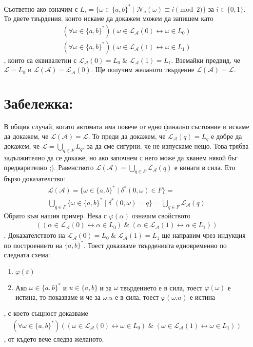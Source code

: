 \documentclass[12pt]{article}
\begin{document}
Съответно ако означим с \(L_i = \{\omega \in \{a, b\}^* \; | \; \mathcal{N}_a(\omega) \equiv i \pmod{2}\}\) за \(i \in \{0, 1\}\). То двете твърдения, които искаме да докажем можем да запишем като
\begin{align*}
    (\forall \omega \in \{a, b\}^*)(\omega \in \mathcal{L}_\mathcal{A}(0) \longleftrightarrow \omega \in L_0) \\
    (\forall \omega \in \{a, b\}^*)(\omega \in \mathcal{L}_\mathcal{A}(1) \longleftrightarrow \omega \in L_1) 
\end{align*}
, които са еквивалетни с \(\mathcal{L}_\mathcal{A}(0) = L_0 \; \& \; \mathcal{L}_\mathcal{A}(1) = L_1\).
Вземайки предвид, че \(\mathcal{L} = L_0\) и \(\mathcal{L}(\mathcal{A}) = \mathcal{L}_\mathcal{A}(0)\). Ще получим желаното твърдение \(\mathcal{L}(\mathcal{A}) = \mathcal{L}\).
\section*{Забележка:}
В общия случай, когато автомата има повече от едно финално състояние и искаме да докажем, че \(\mathcal{L}(\mathcal{A}) = \mathcal{L}\).
То преди да докажем, че \(\mathcal{L}_\mathcal{A}(q) = L_q\) е добре да докажем, че
\(\mathcal{L} = \displaystyle\bigcup_{q \in F} L_q\), за да сме сигурни, че не изпускаме нещо. Това трябва задължително да се докаже, но ако започнем с него може да хванем някой бъг предварително ;). Равенството \(\mathcal{L}(\mathcal{A}) = \displaystyle\bigcup_{q \in F} \mathcal{L}_\mathcal{A}(q)\) е винаги в сила. Ето бързо доказателство:
\begin{align*}
\mathcal{L}(\mathcal{A}) = \{\omega \in \{a, b\}^* \; | \; \delta^*(0, \omega) \in F\} = \\
\displaystyle\bigcup_{q \in F} \{\omega \in \{a, b\}^* \; | \; \delta^*(0, \omega) = q\} =  \displaystyle\bigcup_{q \in F} \mathcal{L}_\mathcal{A}(q)
\end{align*}
Обрато към нашия пример.
Нека с \(\varphi(\alpha)\) означим свойството
\begin{align*}
    ((\alpha \in \mathcal{L}_\mathcal{A}(0) \longleftrightarrow \alpha \in L_0) \; \& \; (\alpha \in \mathcal{L}_\mathcal{A}(1) \longleftrightarrow \alpha \in L_1))    
\end{align*}.
Доказателството на \(\mathcal{L}_\mathcal{A}(0) = L_0 \; \& \; \mathcal{L}_\mathcal{A}(1) = L_1\) ще направим чрез индукция по построението на
\(\{a, b\}^*\). 
Тоест доказваме твърденията едновременно по следната схема:
\begin{enumerate}
    \item \(\varphi(\varepsilon)\)
    \item Ако \(\omega \in \{a, b\}^*\) и \(u \in \{a, b\}\) и за \(\omega\) твърдението е в сила, тоест \(\varphi(\omega)\) е истина, то показваме и че за \(\omega.u\) е в сила, тоест \(\varphi(\omega.u)\) е истина
\end{enumerate}
, с което същност доказваме
\begin{align*}
    (\forall \omega \in \{a, b\}^*)((\omega \in \mathcal{L}_\mathcal{A}(0) \longleftrightarrow \omega \in L_0) \; \& \; (\omega \in \mathcal{L}_\mathcal{A}(1) \longleftrightarrow \omega \in L_1))
\end{align*},
от където вече следва желаното.
\end{document}

